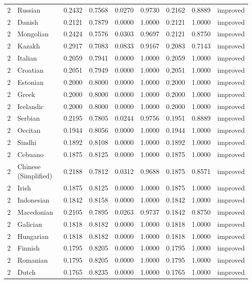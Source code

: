 \begin{tabular}{rlrrrrrrl}
2 & Russian & 0.2432 & 0.7568 & 0.0270 & 0.9730 & 0.2162 & 0.8889 & improved \\
2 & Danish & 0.2121 & 0.7879 & 0.0000 & 1.0000 & 0.2121 & 1.0000 & improved \\
2 & Mongolian & 0.2424 & 0.7576 & 0.0303 & 0.9697 & 0.2121 & 0.8750 & improved \\
2 & Kazakh & 0.2917 & 0.7083 & 0.0833 & 0.9167 & 0.2083 & 0.7143 & improved \\
2 & Italian & 0.2059 & 0.7941 & 0.0000 & 1.0000 & 0.2059 & 1.0000 & improved \\
2 & Croatian & 0.2051 & 0.7949 & 0.0000 & 1.0000 & 0.2051 & 1.0000 & improved \\
2 & Estonian & 0.2000 & 0.8000 & 0.0000 & 1.0000 & 0.2000 & 1.0000 & improved \\
2 & Greek & 0.2000 & 0.8000 & 0.0000 & 1.0000 & 0.2000 & 1.0000 & improved \\
2 & Icelandic & 0.2000 & 0.8000 & 0.0000 & 1.0000 & 0.2000 & 1.0000 & improved \\
2 & Serbian & 0.2195 & 0.7805 & 0.0244 & 0.9756 & 0.1951 & 0.8889 & improved \\
2 & Occitan & 0.1944 & 0.8056 & 0.0000 & 1.0000 & 0.1944 & 1.0000 & improved \\
2 & Sindhi & 0.1892 & 0.8108 & 0.0000 & 1.0000 & 0.1892 & 1.0000 & improved \\
2 & Cebuano & 0.1875 & 0.8125 & 0.0000 & 1.0000 & 0.1875 & 1.0000 & improved \\
2 & Chinese (Simplified) & 0.2188 & 0.7812 & 0.0312 & 0.9688 & 0.1875 & 0.8571 & improved \\
2 & Irish & 0.1875 & 0.8125 & 0.0000 & 1.0000 & 0.1875 & 1.0000 & improved \\
2 & Indonesian & 0.1842 & 0.8158 & 0.0000 & 1.0000 & 0.1842 & 1.0000 & improved \\
2 & Macedonian & 0.2105 & 0.7895 & 0.0263 & 0.9737 & 0.1842 & 0.8750 & improved \\
2 & Galician & 0.1818 & 0.8182 & 0.0000 & 1.0000 & 0.1818 & 1.0000 & improved \\
2 & Hungarian & 0.1818 & 0.8182 & 0.0000 & 1.0000 & 0.1818 & 1.0000 & improved \\
2 & Finnish & 0.1795 & 0.8205 & 0.0000 & 1.0000 & 0.1795 & 1.0000 & improved \\
2 & Romanian & 0.1795 & 0.8205 & 0.0000 & 1.0000 & 0.1795 & 1.0000 & improved \\
2 & Dutch & 0.1765 & 0.8235 & 0.0000 & 1.0000 & 0.1765 & 1.0000 & improved \\

\end{tabular}
